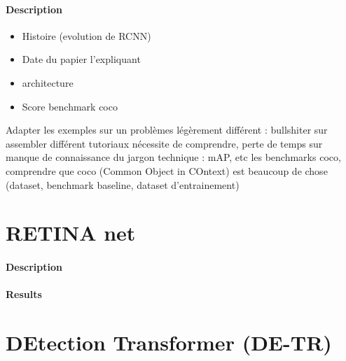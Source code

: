 \paragraph{Description}





\begin{itemize}
    \item Histoire (evolution de RCNN) 
    \item Date du papier l’expliquant 
    \item architecture
    \item Score benchmark coco
\end{itemize}
Adapter les exemples sur un problèmes légèrement différent : bullshiter sur assembler différent tutoriaux nécessite de comprendre, perte de temps sur manque de connaissance du jargon technique : mAP, etc les benchmarks coco, comprendre que coco (Common Object in COntext) est beaucoup de chose (dataset, benchmark baseline, dataset d’entrainement)





\section{RETINA net}
\paragraph{Description}

\paragraph{Results}

\section{DEtection Transformer (DE-TR)}
